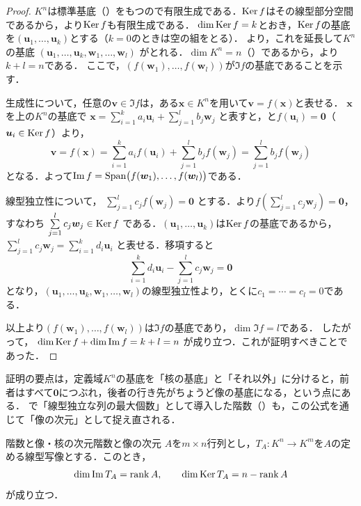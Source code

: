 \begin{tleftbar}
\begin{proof}
  $K^n$は標準基底（）をもつので有限生成である．$\operatorname{Ker} f$はその線型部分空間であるから，より$\operatorname{Ker} f$も有限生成である．
  $\dim \operatorname{Ker} f = k$とおき，$\operatorname{Ker} f$の基底を$(\bm{u}_1, \dots, \bm{u}_k)$とする（$k = 0$のときは空の組をとる）．
  より，これを延長して$K^n$の基底
  $(\bm{u}_1, \dots, \bm{u}_k, \bm{w}_1, \dots, \bm{w}_l)$
  がとれる．$\dim K^n = n$（）であるから，より$k + l = n$である．
  ここで，$(f(\bm{w}_1), \dots, f(\bm{w}_l))$が$\Im f$の基底であることを示す．

  生成性について，任意の$\bm{v} \in \Im f$は，ある$\bm{x} \in K^n$を用いて$\bm{v} = f(\bm{x})$と表せる．
  $\bm{x}$を上の$K^n$の基底で
  $\bm{x} = \sum_{i=1}^{k} a_i \bm{u}_i + \sum_{j=1}^{l} b_j \bm{w}_j$
  と表すと，と$f(\bm{u}_i) = \bm{0}$（$\bm{u}_i \in \operatorname{Ker} f$）より，
  \[
    \bm{v} = f(\bm{x})
    = \sum_{i=1}^{k} a_i f(\bm{u}_i) + \sum_{j=1}^{l} b_j f(\bm{w}_j)
    = \sum_{j=1}^{l} b_j f(\bm{w}_j)
  \]
  となる．よって$\operatorname{Im} f = \operatorname{Span}\bigl(f(\bm{w}_1), \dots, f(\bm{w}_l)\bigr)$である．

  線型独立性について，
  $\sum_{j=1}^{l} c_j f(\bm{w}_j) = \bm{0}$
  とする．より$f\left(\sum_{j=1}^{l} c_j \bm{w}_j\right) = \bm{0}$，すなわち
  $\sum_{j=1}^{l} c_j \bm{w}_j \in \Ker f$
  である．$(\bm{u}_1, \dots, \bm{u}_k)$は$\operatorname{Ker} f$の基底であるから，
  $\sum_{j=1}^{l} c_j \bm{w}_j = \sum_{i=1}^{k} d_i \bm{u}_i$
  と表せる．移項すると
  \[
    \sum_{i=1}^{k} d_i \bm{u}_i - \sum_{j=1}^{l} c_j \bm{w}_j = \bm{0}
  \]
  となり，$(\bm{u}_1, \dots, \bm{u}_k, \bm{w}_1, \dots, \bm{w}_l)$の線型独立性より，とくに$c_1 = \cdots = c_l = 0$である．

  以上より$(f(\bm{w}_1), \dots, f(\bm{w}_l))$は$\Im f$の基底であり，$\dim \Im f = l$である．
  したがって，
  $\dim \operatorname{Ker} f + \dim \operatorname{Im} f = k + l = n$
  が成り立つ．これが証明すべきことであった．
\end{proof}
\end{tleftbar}

証明の要点は，定義域$K^n$の基底を「核の基底」と「それ以外」に分けると，前者はすべて$\bm{0}$につぶれ，後者の行き先がちょうど像の基底になる，という点にある．
で「線型独立な列の最大個数」として導入した階数（）も，この公式を通じて「像の次元」として捉え直される．

\begin{cor}{階数と像・核の次元}{階数と像の次元}
  $A$を$m \times n$行列とし，$T_A \colon K^n \to K^m$を$A$の定める線型写像とする．このとき，
  \[
    \dim \operatorname{Im} T_A = \operatorname{rank} A,
    \qquad
    \dim \operatorname{Ker} T_A = n - \operatorname{rank} A
  \]
  が成り立つ．
\end{cor}


